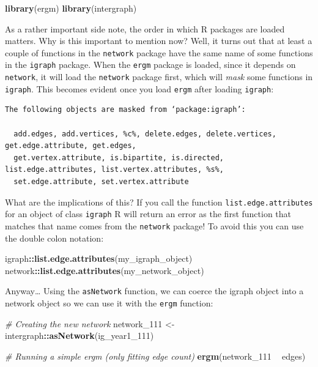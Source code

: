 \documentclass[]{book}
\newenvironment{Shaded}{\begin{snugshade}}{\end{snugshade}}
\newcommand{\KeywordTok}[1]{\textcolor[rgb]{0.13,0.29,0.53}{\textbf{#1}}}
\newcommand{\DecValTok}[1]{\textcolor[rgb]{0.00,0.00,0.81}{#1}}
\newcommand{\StringTok}[1]{\textcolor[rgb]{0.31,0.60,0.02}{#1}}
\newcommand{\CommentTok}[1]{\textcolor[rgb]{0.56,0.35,0.01}{\textit{#1}}}
\newcommand{\OperatorTok}[1]{\textcolor[rgb]{0.81,0.36,0.00}{\textbf{#1}}}
\newcommand{\NormalTok}[1]{#1}
\theoremstyle{definition}
\theoremstyle{definition}
\theoremstyle{definition}
\theoremstyle{remark}
\begin{document}
\begin{Shaded}
\begin{Highlighting}[]
\KeywordTok{library}\NormalTok{(ergm)}
\KeywordTok{library}\NormalTok{(intergraph)}
\end{Highlighting}
\end{Shaded}

As a rather important side note, the order in which R packages are
loaded matters. Why is this important to mention now? Well, it turns out
that at least a couple of functions in the \texttt{network} package have
the same name of some functions in the \texttt{igraph} package. When the
\texttt{ergm} package is loaded, since it depends on \texttt{network},
it will load the \texttt{network} package first, which will \emph{mask}
some functions in \texttt{igraph}. This becomes evident once you load
\texttt{ergm} after loading \texttt{igraph}:

\begin{verbatim}
The following objects are masked from ‘package:igraph’:

  add.edges, add.vertices, %c%, delete.edges, delete.vertices, get.edge.attribute, get.edges,
  get.vertex.attribute, is.bipartite, is.directed, list.edge.attributes, list.vertex.attributes, %s%,
  set.edge.attribute, set.vertex.attribute
\end{verbatim}

What are the implications of this? If you call the function
\texttt{list.edge.attributes} for an object of class \texttt{igraph} R
will return an error as the first function that matches that name comes
from the \texttt{network} package! To avoid this you can use the double
colon notation:

\begin{Shaded}
\begin{Highlighting}[]
\NormalTok{igraph}\OperatorTok{::}\KeywordTok{list.edge.attributes}\NormalTok{(my_igraph_object)}
\NormalTok{network}\OperatorTok{::}\KeywordTok{list.edge.attributes}\NormalTok{(my_network_object)}
\end{Highlighting}
\end{Shaded}

Anyway\ldots{} Using the \texttt{asNetwork} function, we can coerce the
igraph object into a network object so we can use it with the
\texttt{ergm} function:

\begin{Shaded}
\begin{Highlighting}[]
\CommentTok{# Creating the new network}
\NormalTok{network_}\DecValTok{111}\NormalTok{ <-}\StringTok{ }\NormalTok{intergraph}\OperatorTok{::}\KeywordTok{asNetwork}\NormalTok{(ig_year1_}\DecValTok{111}\NormalTok{)}

\CommentTok{# Running a simple ergm (only fitting edge count)}
\KeywordTok{ergm}\NormalTok{(network_}\DecValTok{111} \OperatorTok{~}\StringTok{ }\NormalTok{edges)}
\end{Highlighting}
\end{Shaded}
\end{document}
